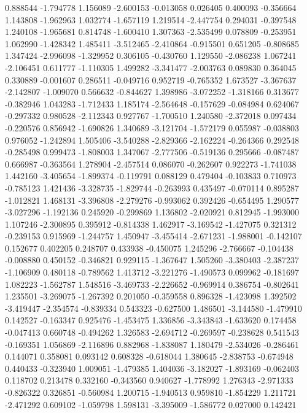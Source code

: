 0.888544
-1.794778
1.156089
-2.600153
-0.013058
0.026405
0.400093
-0.356664
1.143808
-1.962963
1.032774
-1.657119
1.219514
-2.447754
0.294031
-0.397548
1.240108
-1.965681
0.814748
-1.600410
1.307363
-2.535499
0.078809
-0.253951
1.062990
-1.428342
1.485411
-3.512465
-2.410864
-0.915501
0.651205
-0.808685
1.347424
-2.996098
-1.329952
0.306105
-0.430760
1.129550
-2.086238
1.067241
-2.106451
0.611777
-1.110305
1.499282
-3.341477
-2.003763
0.089830
0.364045
0.330889
-0.001607
0.286511
-0.049716
0.952719
-0.765352
1.673527
-3.367637
-2.142807
-1.009070
0.566632
-0.844627
1.398986
-3.072252
-1.318166
0.313677
-0.382946
1.043283
-1.712433
1.185174
-2.564648
-0.157629
-0.084984
0.624067
-0.297332
0.980528
-2.112343
0.927767
-1.700510
1.240580
-2.372018
0.097434
-0.220576
0.856942
-1.690826
1.340689
-3.121704
-1.572179
0.055987
-0.038803
0.976052
-1.242894
1.505406
-3.540288
-2.829366
-2.162224
-0.264366
0.292548
-0.285498
0.999473
-1.808003
1.347067
-2.777506
-0.519136
0.295666
-0.087487
0.666987
-0.363564
1.278904
-2.457514
0.086070
-0.262607
0.922273
-1.741038
1.442160
-3.405654
-1.899374
-0.119791
0.088129
0.479404
-0.103833
0.710973
-0.785123
1.421436
-3.328735
-1.829744
-0.263993
0.435497
-0.070114
0.895287
-1.012821
1.468131
-3.396808
-2.279276
-0.993062
0.392426
-0.654495
1.290577
-3.027296
-1.192136
0.245920
-0.299869
1.136802
-2.020921
0.812945
-1.993000
1.107246
-2.300895
0.395912
-0.814338
1.462917
-3.169542
-1.427075
0.321312
-0.239153
0.915969
-1.244757
1.450947
-3.455414
-2.671231
-1.988001
-0.142107
0.152677
0.402205
0.248707
0.433938
-0.450075
1.245296
-2.766667
-0.104438
-0.008880
0.450152
-0.346821
0.929115
-1.367647
1.505260
-3.380403
-2.387237
-1.106909
0.480118
-0.789562
1.413712
-3.221276
-1.490573
0.099962
-0.181697
1.082223
-1.562787
1.548516
-3.469733
-2.226652
-0.969914
0.386754
-0.802641
1.235501
-3.269075
-1.267392
0.201050
-0.359558
0.896328
-1.423098
1.392502
-3.419447
-2.354574
-0.839334
0.543323
-0.627500
1.486501
-3.144580
-1.479910
0.142527
-0.163347
0.925476
-1.453475
1.336856
-3.343843
-1.633620
0.174458
-0.047413
0.660748
-0.494262
1.326583
-2.694712
-0.269597
-0.238628
0.541543
-0.169351
1.056869
-2.116896
0.882968
-1.838087
1.180479
-2.534026
-0.286461
0.144071
0.358081
0.093142
0.608328
-0.618044
1.380645
-2.838753
-0.674948
0.440433
-0.323940
1.009051
-1.479385
1.404036
-3.182027
-1.893169
-0.062403
0.118702
0.213478
0.332160
-0.343560
0.940627
-1.778992
1.276343
-2.971333
-0.826322
0.326851
-0.560984
1.200715
-1.940513
0.959810
-1.854229
1.211721
-2.471292
0.609102
-1.059798
1.598131
-3.395009
-1.586772
0.027000
0.142421

